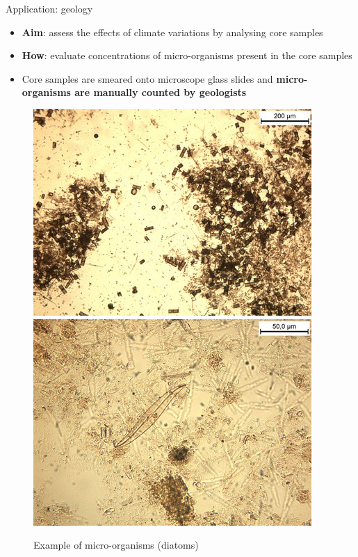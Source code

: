 \documentclass{beamer}
\begin{document}
\begin{frame}{Application: geology}
	\begin{itemize}
		\item \textbf{Aim}: assess the effects of climate variations by analysing core samples
		\item \textbf{How}: evaluate concentrations of micro-organisms present in the core samples
		\item Core samples are smeared onto microscope glass slides and \textbf{micro-organisms are manually counted by geologists}
	\end{itemize}
	\begin{figure}
		\includegraphics[scale=0.35]{images/diatomee-1.jpg}
		\hspace{1cm}
		\includegraphics[scale=0.35]{images/diatomee-2.jpg}
		\caption{Example of micro-organisms (diatoms)}	
	\end{figure}
\end{frame}
\end{document}
